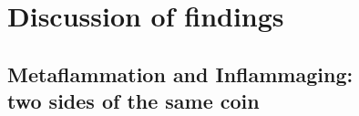 
\section{Discussion of findings}

\subsection[Metaflammation and Inflammaging: two sides of the same coin]{Metaflammation and Inflammaging:\\ two sides of the same coin}

\vspace{20pt}


